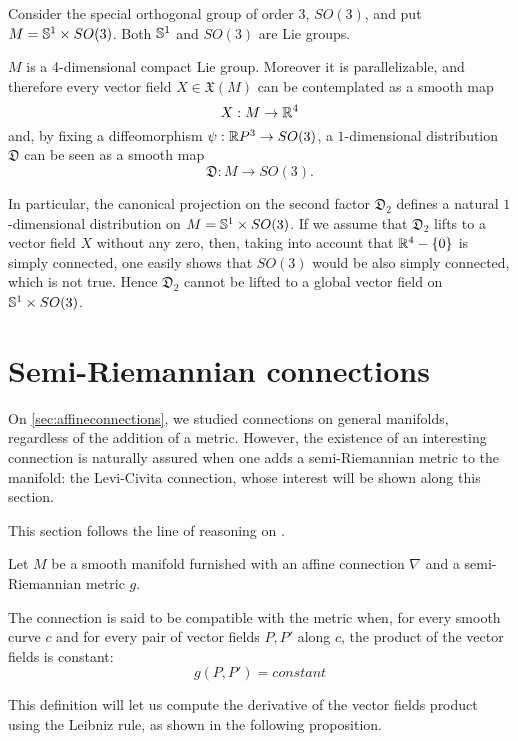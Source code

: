 \begin{example}
	\label{ex:nonvanishing}
	Consider the special orthogonal group of order 3, $SO(3)$, and put $M=\S^{1}\times SO(3)$. Both $\S^1$ and $SO(3)$ are Lie groups.
	
	$M$ is a 4-dimensional compact Lie group. Moreover it is parallelizable, and therefore every vector field $X\in\mathfrak{X}(M)$ can be contemplated as a smooth map $$X:M\rightarrow \R^{4}$$ and, by fixing a diffeomorphism $\psi:\R P^{3}\rightarrow SO(3)$, a $1$-dimensional distribution $\mathfrak{D}$ can be seen as a smooth map $$\mathfrak{D}:M\rightarrow SO(3).$$
	
	In particular, the canonical projection on the second factor $\mathfrak{D}_2$ defines a natural $1$-dimensional distribution on $M=\S^{1}\times SO(3)$. If we assume that $\mathfrak{D}_2$ lifts to a vector field $X$ without any zero, then, taking into account that $\R^{4}-\{0\}$ is simply connected, one easily shows that $SO(3)$ would be also simply connected, which is not true. Hence $\mathfrak{D}_2$ cannot be lifted to a global vector field on $\S^{1}\times SO(3)$.
\end{example}

\section{Semi-Riemannian connections}

On \autoref{sec:affineconnections}, we studied connections on general manifolds, regardless of the addition of a metric. However, the existence of an interesting connection is naturally assured when one adds a semi-Riemannian metric to the manifold: the Levi-Civita connection, whose interest will be shown along this section.

This section follows the line of reasoning on \cite[Ch. 2, Section 3]{docarmo79}.

\begin{definition}
	Let $M$ be a smooth manifold furnished with an affine connection $\nabla$ and a semi-Riemannian metric $g$.
	
	The connection is said to be compatible with the metric when, for every smooth curve $c$ and for every pair of vector fields $P, P'$ along $c$, the product of the vector fields is constant:
	\[
		g(P, P') = constant
	\]
\end{definition}

This definition will let us compute the derivative of the vector fields product using the Leibniz rule, as shown in the following proposition.


